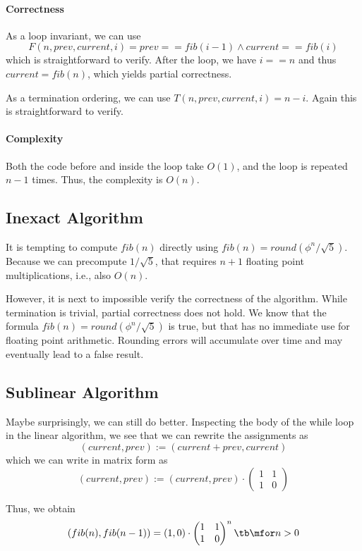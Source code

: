 \paragraph{Correctness}
As a loop invariant, we can use
\[F(n,prev,current,i) = prev==fib(i-1)\wedge current==fib(i)\]
which is straightforward to verify.
After the loop, we have $i==n$ and thus $current=fib(n)$, which yields partial correctness.

As a termination ordering, we can use $T(n,prev,current,i)=n-i$.
Again this is straightforward to verify.

\paragraph{Complexity}
Both the code before and inside the loop take $O(1)$, and the loop is repeated $n-1$ times.
Thus, the complexity is $O(n)$.

\subsection{Inexact Algorithm}\label{sec:ad:fib:inexact}

It is tempting to compute $fib(n)$ directly using $fib(n)=round(\phi^n/\sqrt{5})$.
Because we can precompute $1/\sqrt{5}$, that requires $n+1$ floating point multiplications, i.e., also $O(n)$.

However, it is next to impossible verify the correctness of the algorithm.
While termination is trivial, partial correctness does not hold.
We know that the formula $fib(n)=round(\phi^n/\sqrt{5})$ is true, but that has no immediate use for floating point arithmetic.
Rounding errors will accumulate over time and may eventually lead to a false result.

\subsection{Sublinear Algorithm}\label{sec:ad:fib:sublinear}

Maybe surprisingly, we can still do better.
Inspecting the body of the while loop in the linear algorithm, we see that we can rewrite the assignments as
\[(current,prev):=(current+prev, current)\]
which we can write in matrix form as
\[(current,prev):=(current,prev)\cdot\begin{pmatrix}1&1\\1&0\end{pmatrix}\]

Thus, we obtain
\[(fib(n),fib(n-1))= (1,0)\cdot\begin{pmatrix}1&1\\1&0\end{pmatrix}^n \tb\mfor n>0\]

